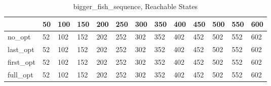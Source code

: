 \begin{table}
\caption{bigger\_fish\_sequence, Reachable States}
\label{bigger_fish_sequence_reach}
\begin{tabular}{lllllllllllll}
\toprule
 & 50 & 100 & 150 & 200 & 250 & 300 & 350 & 400 & 450 & 500 & 550 & 600 \\
\midrule
no\_opt & 52 & 102 & 152 & 202 & 252 & 302 & 352 & 402 & 452 & 502 & 552 & 602 \\
last\_opt & 52 & 102 & 152 & 202 & 252 & 302 & 352 & 402 & 452 & 502 & 552 & 602 \\
first\_opt & 52 & 102 & 152 & 202 & 252 & 302 & 352 & 402 & 452 & 502 & 552 & 602 \\
full\_opt & 52 & 102 & 152 & 202 & 252 & 302 & 352 & 402 & 452 & 502 & 552 & 602 \\
\bottomrule
\end{tabular}
\end{table}
